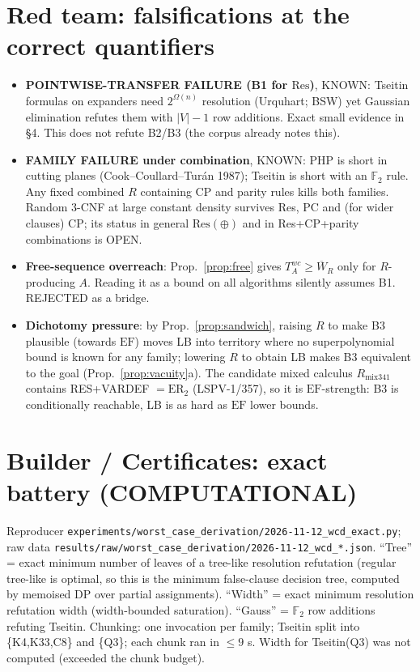 \documentclass[11pt]{article}
\theoremstyle{definition}
\newcommand{\Wb}{\overline W}
\newcommand{\Res}{\mathrm{Res}}
\newcommand{\EF}{\mathrm{EF}}
\begin{document}
\section{Red team: falsifications at the correct quantifiers}
\begin{itemize}
\item \textbf{POINTWISE-TRANSFER FAILURE (B1 for $\Res$)}, KNOWN: Tseitin
formulas on expanders need $2^{\Omega(n)}$ resolution (Urquhart; BSW) yet
Gaussian elimination refutes them with $|V|-1$ row additions. Exact small
evidence in \S4. This does not refute B2/B3 (the corpus already notes this).
\item \textbf{FAMILY FAILURE under combination}, KNOWN: PHP is short in
cutting planes (Cook--Coullard--Tur\'an 1987); Tseitin is short with an
$\mathbb F_2$ rule. Any fixed combined $R$ containing CP and parity rules
kills both families. Random 3-CNF at large constant density survives Res, PC
and (for wider clauses) CP; its status in general $\Res(\oplus)$ and in
Res+CP+parity combinations is OPEN.
\item \textbf{Free-sequence overreach}: Prop.~\ref{prop:free} gives
$T^{wc}_A\ge\Wb_R$ only for $R$-producing $A$. Reading it as a bound on all
algorithms silently assumes B1. REJECTED as a bridge.
\item \textbf{Dichotomy pressure}: by Prop.~\ref{prop:sandwich}, raising $R$ to
make B3 plausible (towards $\EF$) moves LB into territory where no
superpolynomial bound is known for any family; lowering $R$ to obtain LB makes
B3 equivalent to the goal (Prop.~\ref{prop:vacuity}a). The candidate
mixed calculus $R_{\mathrm{mix341}}$ contains RES+VARDEF $=\mathrm{ER}_2$
(LSPV-1/357), so it is $\EF$-strength: B3 is conditionally reachable, LB is
as hard as $\EF$ lower bounds.
\end{itemize}

\section{Builder / Certificates: exact battery (COMPUTATIONAL)}
Reproducer \texttt{experiments/worst\_case\_derivation/2026-11-12\_wcd\_exact.py};
raw data \texttt{results/raw/worst\_case\_derivation/2026-11-12\_wcd\_*.json}.
``Tree'' = exact minimum number of leaves of a tree-like resolution refutation
(regular tree-like is optimal, so this is the minimum false-clause decision
tree, computed by memoised DP over partial assignments). ``Width'' = exact
minimum resolution refutation width (width-bounded saturation). ``Gauss'' =
$\mathbb F_2$ row additions refuting Tseitin. Chunking: one invocation per
family; Tseitin split into \{K4,K33,C8\} and \{Q3\}; each chunk ran in $\le 9$ s.
Width for Tseitin(Q3) was not computed (exceeded the chunk budget).
\end{document}
